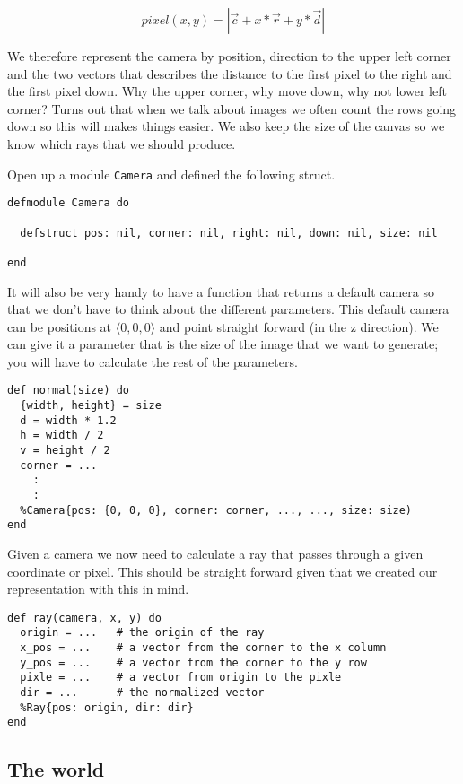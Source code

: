 \documentclass[a4paper,11pt]{article}
\begin{document}
$$pixel(x,y) = |\vec{c} + x*\vec{r} + y*\vec{d}|$$

We therefore represent the camera by position, direction to the upper
left corner and the two vectors that describes the distance to the
first pixel to the right and the first pixel down. Why the upper
corner, why move down, why not lower left corner? Turns out that when
we talk about images we often count the rows going down so this will
makes things easier. We also keep the size of the canvas so we know
which rays that we should produce.

Open up a module {\tt Camera} and defined the following struct.

\begin{verbatim}
defmodule Camera do

  defstruct pos: nil, corner: nil, right: nil, down: nil, size: nil
  
end
\end{verbatim}

It will also be very handy to have a function that returns a default
camera so that we don't have to think about the different
parameters. This default camera can be positions at
$\langle 0,0,0\rangle$ and point straight forward (in the z
direction). We can give it a parameter that is the size of the image
that we want to generate; you will have to calculate the rest of the
parameters.

\begin{verbatim}
def normal(size) do
  {width, height} = size
  d = width * 1.2
  h = width / 2
  v = height / 2
  corner = ...
    :
    :
  %Camera{pos: {0, 0, 0}, corner: corner, ..., ..., size: size)
end
\end{verbatim}

Given a camera we now need to calculate a ray that passes through a
given coordinate or pixel. This should be straight forward given that
we created our representation with this in mind.

\begin{verbatim}
def ray(camera, x, y) do
  origin = ...   # the origin of the ray
  x_pos = ...    # a vector from the corner to the x column
  y_pos = ...    # a vector from the corner to the y row
  pixle = ...    # a vector from origin to the pixle
  dir = ...      # the normalized vector
  %Ray{pos: origin, dir: dir}
end
\end{verbatim}


\subsection*{The world}
\end{document}
